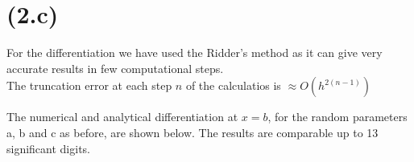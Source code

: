 \section{(2.c)}
For the differentiation we have used the Ridder's method as it can give very accurate results in few computational steps.\\
The truncation error at each step $n$ of the calculatios is $\approx O(h^{2(n-1)})$



The numerical and analytical differentiation at $x=b$, for the random parameters a, b and c as before, are shown below. The results are comparable up to 13 significant digits.


